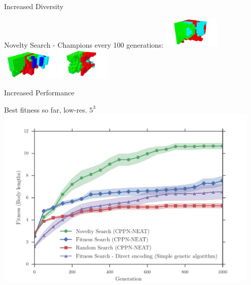 \documentclass[6pt]{beamer}
\begin{document}
{\begin{frame}{Increased Diversity}
\begin{block}{Novelty Search - Champions every 100 generations:}
\includegraphics[width=0.2\textwidth]{../Figures/Robots/n_4_g_800.jpg}
\includegraphics[width=0.2\textwidth]{../Figures/Robots/n_4_g_900.jpg}
\includegraphics[width=0.2\textwidth]{../Figures/Robots/n_4_g_1000.jpg}
\end{block}
\end{frame}

\begin{frame}{Increased Performance}
\begin{block}{Best fitness so far, low-res. $5^3$}
\centering
\includegraphics[width=0.95\textwidth]{../Figures/Results/FitNovRandomDirectSize5.pdf}
\end{block}
\end{frame}

}
\end{document}
